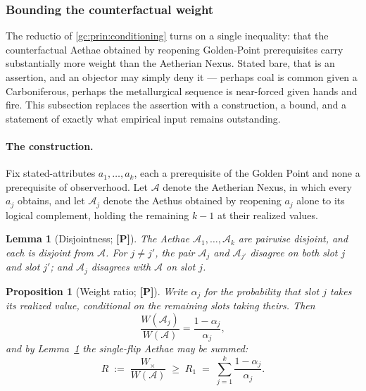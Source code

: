 \documentclass[11pt]{article}
\numberwithin{equation}{section}
\theoremstyle{plain}
\newtheorem{proposition}[theorem]{Proposition}
\newtheorem{lemma}[theorem]{Lemma}
\theoremstyle{definition}
\theoremstyle{remark}
\begin{document}
\subsubsection{Bounding the counterfactual weight}
\label{gc:subsub:weightbound}

The reductio of \ref{gc:prin:conditioning} turns on a single inequality:
that the counterfactual Aethae obtained by reopening Golden-Point
prerequisites carry substantially more weight than the Aetherian Nexus.
Stated bare, that is an assertion, and an objector may simply deny it ---
perhaps coal is common given a Carboniferous, perhaps the metallurgical
sequence is near-forced given hands and fire. This subsection replaces
the assertion with a construction, a bound, and a statement of exactly
what empirical input remains outstanding.

\paragraph{The construction.} Fix stated-attributes
$a_1,\dots,a_k$, each a prerequisite of the Golden Point and none a
prerequisite of observerhood. Let $\mathcal A$ denote the Aetherian
Nexus, in which every $a_j$ obtains, and let $\mathcal A_j$ denote the
Aethus obtained by reopening $a_j$ alone to its logical complement,
holding the remaining $k-1$ at their realized values.

\begin{lemma}[Disjointness; \textbf{[P]}]\label{gc:lem:disjoint}
The Aethae $\mathcal A_1,\dots,\mathcal A_k$ are pairwise disjoint, and
each is disjoint from $\mathcal A$. For $j\neq j'$, the pair
$\mathcal A_j$ and $\mathcal A_{j'}$ disagree on \emph{both} slot $j$
and slot $j'$; and $\mathcal A_j$ disagrees with $\mathcal A$ on slot
$j$.
\end{lemma}

\begin{proposition}[Weight ratio; \textbf{[P]}]\label{gc:prop:ratio}
Write $\alpha_j$ for the probability that slot $j$ takes its realized
value, conditional on the remaining slots taking theirs. Then
\begin{equation}\label{gc:eq:ratio}
\frac{W(\mathcal A_j)}{W(\mathcal A)}=\frac{1-\alpha_j}{\alpha_j},
\end{equation}
and by Lemma~\ref{gc:lem:disjoint} the single-flip Aethae may be summed:
\begin{equation}\label{gc:eq:bound}
R \;:=\; \frac{W_\times}{W(\mathcal A)}
\;\ge\; R_1 \;=\; \sum_{j=1}^{k}\frac{1-\alpha_j}{\alpha_j}.
\end{equation}
\end{proposition}
\end{document}
